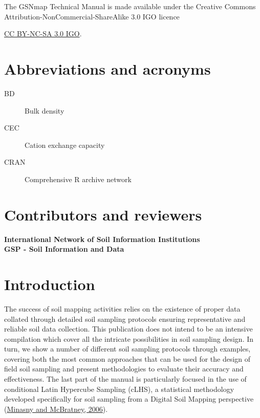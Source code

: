 \documentclass[
  10pt,
  b5paper,
  oneside]{book}
\begin{document}
The GSNmap Technical Manual is made available under the Creative Commons Attribution-NonCommercial-ShareAlike 3.0 IGO licence

\href{https://creativecommons.org/licenses/by-nc-sa/3.0/igo/legalcode}{CC BY-NC-SA 3.0 IGO}.

\hypertarget{abbreviations-and-acronyms}{%
\chapter*{Abbreviations and acronyms}\label{abbreviations-and-acronyms}}

\begin{description}
\item[BD]
Bulk density
\item[CEC]
Cation exchange capacity
\item[CRAN]
Comprehensive R archive network
\end{description}

\hypertarget{contributors-and-reviewers}{%
\chapter*{Contributors and reviewers}\label{contributors-and-reviewers}}

\textbf{International Network of Soil Information Institutions}\\

\textbf{GSP - Soil Information and Data}\\

\hypertarget{introduction}{%
\chapter{Introduction}\label{introduction}}

The success of soil mapping activities relies on the existence of proper data collated through detailed soil sampling protocols ensuring representative and reliable soil data collection. This publication does not intend to be an intensive compilation which cover all the intricate possibilities in soil sampling design. In turn, we show a number of different soil sampling protocols through examples, covering both the most common approaches that can be used for the design of field soil sampling and present methodologies to evaluate their accuracy and effectiveness. The last part of the manual is particularly focused in the use of conditional Latin Hypercube Sampling (cLHS), a statistical methodology developed specifically for soil sampling from a Digital Soil Mapping perspective (\protect\hyperlink{ref-minasny2006}{Minasny and McBratney, 2006}).
\end{document}

